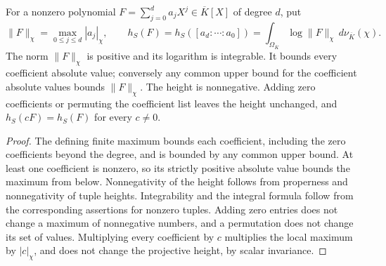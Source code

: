 \begin{definition}
\label{def:polynomial-height}
\leanok
For a nonzero polynomial $F=\sum_{j=0}^d a_jX^j\in\overline K[X]$
of degree $d$, put
\[
 \|F\|_\chi=\max_{0\leq j\leq d}|a_j|_\chi,
 \qquad
 h_S(F)=h_S([a_d:\cdots:a_0])
 =\int_{\Omega_{\overline K}}\log\|F\|_\chi\,d\nu_{\overline K}(\chi).
\]
The norm $\|F\|_\chi$ is positive and its logarithm is integrable.
It bounds every coefficient absolute value; conversely any common upper
bound for the coefficient absolute values bounds $\|F\|_\chi$.
The height is nonnegative.
Adding zero coefficients or permuting the coefficient list leaves
the height unchanged, and $h_S(cF)=h_S(F)$ for every $c\ne0$.
\end{definition}
\begin{proof}
The defining finite maximum bounds each coefficient, including the zero
coefficients beyond the degree, and is bounded by any common upper bound.
At least one coefficient is nonzero, so its strictly positive absolute
value bounds the maximum from below. Nonnegativity of the height follows
from properness and nonnegativity of tuple heights. Integrability and the integral
formula follow from the corresponding assertions for nonzero tuples.
Adding zero entries does not change a maximum of nonnegative numbers,
and a permutation does not change its set of values. Multiplying every coefficient by $c$ multiplies the local maximum by
$|c|_\chi$, and does not change the projective height, by scalar invariance.
\end{proof}

